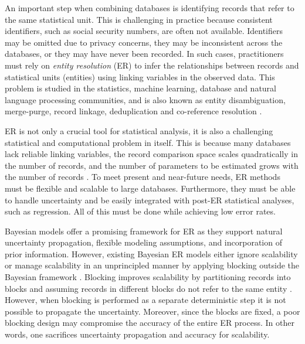 \documentclass[12pt,letterpaper]{article}
\newcommand{\1}[1]{\mathbb{I}\!\left[#1\right]} %
\begin{document}
An important step when combining databases is identifying records that 
refer to the same statistical unit. 
This is challenging in practice because consistent identifiers, such 
as social security numbers, are often not available. 
Identifiers may be omitted due to privacy concerns, they may be 
inconsistent across the databases, or they may have never been 
recorded. 
In such cases, practitioners must rely on  {\em entity resolution} 
(ER) to infer the relationships between records and statistical units 
(entities) using linking variables in the observed data. 
This problem is studied in the statistics, machine learning, database 
and natural language processing communities, and is also known as 
entity disambiguation, merge-purge, record linkage, deduplication 
and co-reference resolution \citep{christen_data_2012, dong_big_2015, 
soon_machine_2001}. 

ER is not only a crucial tool for statistical analysis, it is also a 
challenging statistical and computational problem in itself. 
This is because many databases lack reliable linking variables, the 
record comparison space scales quadratically in the number of records, 
and the number of parameters to be estimated grows with the number of 
records \citep{Herzog_2007, lahiri_2005, winkler_state_1999, 
winkler_2000}. 
To meet present and near-future needs, ER methods must be flexible and 
scalable to large databases. 
Furthermore, they must be able to handle uncertainty and be easily 
integrated with post-ER statistical analyses, such as regression. 
All of this must be done while achieving low error rates. 

Bayesian models offer a promising framework for ER as they support 
natural uncertainty propagation, flexible modeling assumptions, and 
incorporation of prior information. 
However, existing Bayesian ER models either ignore scalability 
\citep{steorts_entity_2015, zanella_flexible_2016, 
sadinle_bayesian_2017} or manage scalability in an unprincipled 
manner by applying blocking outside the Bayesian framework
\citep{fortini_bayesian_2001, larsen_advances_2005, 
larsen_experiment_2012, tancredi_hierarchical_2011, 
gutman_bayesian_2013, sadinle_detecting_2014, steorts_bayesian_2016}. 
Blocking improves scalability by partitioning records into blocks and 
assuming records in different blocks do not refer to the same entity 
\citep{christen_survey_2012}. 
However, when blocking is performed as a separate deterministic step 
it is not possible to propagate the uncertainty. 
Moreover, since the blocks are fixed, a poor blocking design may compromise 
the accuracy of the entire ER process. 
In other words, one sacrifices uncertainty propagation and accuracy 
for scalability. 
\end{document}
